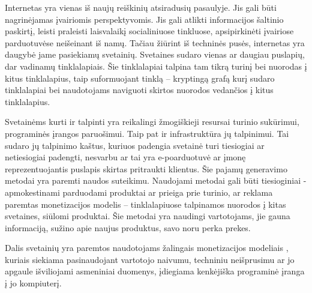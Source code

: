 Internetas yra vienas iš naujų reiškinių atsiradusių pasaulyje. Jis gali būti nagrinėjamas įvairiomis perspektyvomis. Jis gali atlikti informacijos šaltinio paskirtį, leisti praleisti laisvalaikį socialiniuose tinkluose, apsipirkinėti įvairiose parduotuvėse neišeinant iš namų. Tačiau žiūrint iš techninės pusės, internetas yra daugybė jame pasiekiamų svetainių. Svetaines sudaro vienas ar daugiau puslapių, dar vadinamų tinklalapiais. Šie tinklalapiai talpina tam tikrą turinį bei nuorodas į kitus tinklalapius, taip suformuojant tinklą -- kryptingą grafą kurį sudaro tinklalapiai bei naudotojams naviguoti skirtos nuorodos vedančios į kitus tinklalapius.

Svetainėms kurti ir talpinti yra reikalingi žmogiškieji resursai turinio sukūrimui, programinės įrangos paruošimui. Taip pat ir infrastruktūra jų talpinimui. Tai sudaro jų talpinimo kaštus, kuriuos padengia svetainė turi tiesiogiai ar netiesiogiai padengti, nesvarbu ar tai yra e-poarduotuvė ar įmonę reprezentuojantis puslapis skirtas pritraukti klientus. Šie pajamų generavimo metodai yra paremti naudos suteikimu. Naudojami metodai gali būti tiesioginiai - apmokestinami parduodami produktai ar prieiga prie turinio, ar reklama paremtas monetizacijos modelis -- tinklalapiuose talpinamos nuorodos į kitas svetaines, siūlomi produktai. Šie metodai yra naudingi vartotojams, jie gauna informaciją, sužino apie naujus produktus, savo noru perka prekes.

Dalis svetainių yra paremtos naudotojams žalingais monetizacijos modeliais \cite{tax}, kuriais siekiama pasinaudojant vartotojo naivumu, techniniu neišprusimu ar jo apgaule išviliojami asmeniniai duomenys, įdiegiama kenkėjiška programinė įranga į jo kompiuterį.